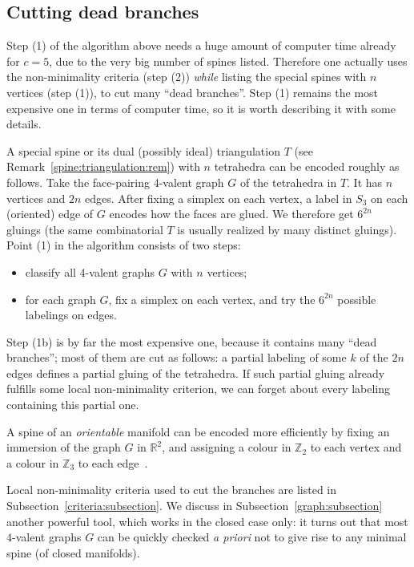 \documentclass[10pt]{article}      %
\newcommand{\matR} {\ensuremath {\mathbb{R}}}
\newcommand{\matZ} {\ensuremath {\mathbb{Z}}}
\begin{document}
\subsection{Cutting dead branches} \label{branches:subsection}
Step (1) of the algorithm above needs a huge
amount of computer time already for $c=5$, due to the
very big number of spines listed.
Therefore one actually uses the non-minimality criteria (step (2)) \emph{while} 
listing the special spines
with $n$ vertices (step (1)), to cut many ``dead branches''. Step (1) 
remains the most expensive one
in terms of computer time, so it is worth describing it with some details. 

A special spine or its dual (possibly ideal) 
triangulation $T$ (see Remark~\ref{spine:triangulation:rem}) with $n$ tetrahedra
can be encoded roughly as follows.
Take the face-pairing 4-valent graph $G$ of the tetrahedra in $T$. 
It has $n$ vertices and $2n$ edges.
After fixing a simplex on each vertex, a
label in $S_3$ on each (oriented) edge of $G$ encodes how the faces are glued.
We therefore get $6^{2n}$ gluings 
(the same combinatorial $T$ is usually realized by many distinct gluings).
Point (1) in the algorithm consists of two steps:
\begin{itemize}
\item[(1a)] classify all 4-valent graphs $G$ with $n$ vertices;
\item[(1b)] for each graph $G$, fix a simplex on each vertex, and 
try the $6^{2n}$ possible labelings on edges.
\end{itemize}
Step (1b) is by far the most expensive one, because it contains
many ``dead branches''; most of them are cut as follows: 
a partial labeling of some $k$ of the $2n$ edges defines a partial gluing of the tetrahedra.
If such partial gluing already fulfills some local non-minimality criterion,
we can forget about every labeling containing this partial one.

\begin{remark} \label{ografi:rem}
A spine of an \emph{orientable} manifold can be encoded more efficiently by fixing
an immersion of the graph $G$
in $\matR^2$, and assigning a colour in $\matZ_2$ to each vertex and a colour in
$\matZ_3$ to each edge~\cite{BePe}.
\end{remark}

Local non-minimality criteria used to cut the branches are listed in Subsection~\ref{criteria:subsection}.
We discuss in Subsection~\ref{graph:subsection} another powerful tool, which works
in the closed case only: it turns out that
most $4$-valent graphs $G$ can be quickly checked \emph{a priori} not to give rise to any
minimal spine (of closed manifolds). 
\end{document}
